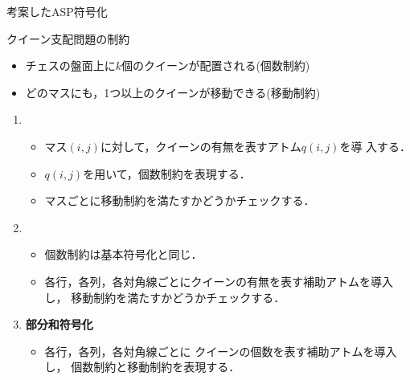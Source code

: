 \documentclass[dvipdfmx,10pt]{beamer}
\begin{document}
\begin{frame}{考案したASP符号化}

  \begin{block}{クイーン支配問題の制約}
    \begin{itemize}
    \item チェスの盤面上に$k$個のクイーンが配置される(個数制約)
    \item どのマスにも，1つ以上のクイーンが移動できる(移動制約)
    \end{itemize}
  \end{block}

  \begin{enumerate}
  \item {}
    \begin{itemize}
    \item マス$(i,j)$に対して，クイーンの有無を表すアトム$q(i,j)$を導
      入する．
    \item $q(i,j)$を用いて，個数制約を表現する．
    \item マスごとに移動制約を満たすかどうかチェックする．
    \end{itemize}
 \item {}
   \begin{itemize}
    \item 個数制約は基本符号化と同じ．
    \item 各行，各列，各対角線ごとにクイーンの有無を表す補助アトムを導入し，
      移動制約を満たすかどうかチェックする．      
   \end{itemize}
 \item \alert{\bf 部分和符号化}
   \begin{itemize}
   \item 各行，各列，各対角線ごとに
     クイーンの個数を表す補助アトムを導入し，
     個数制約と移動制約を表現する．
   \end{itemize}
 \end{enumerate}
\end{frame}


%
%
\end{document}
